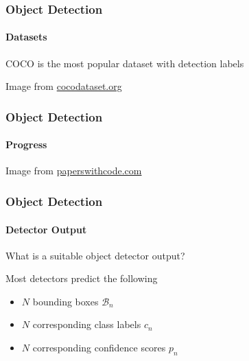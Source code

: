 \documentclass[xetex,professionalfont]{beamer}
\newcommand{\cB}{\mathcal{B}}
\begin{document}
\begin{frame}
	\frametitle{Object Detection}
	\framesubtitle{Datasets}

	COCO is the most popular dataset with detection labels

	\bigskip

	\begin{center}
		{\centering Image from \href{http://cocodataset.org}{cocodataset.org}}
	\end{center}

\end{frame}


\begin{frame}
	\frametitle{Object Detection}
	\framesubtitle{Progress}

	\begin{center}
		{\centering Image from \href{https://paperswithcode.com/sota/object-detection-on-coco}{paperswithcode.com}}
	\end{center}

\end{frame}


\begin{frame}
	\frametitle{Object Detection}
	\framesubtitle{Detector Output}

	What is a suitable object detector output?

	\bigskip

	Most detectors predict the following
	\begin{itemize}
		\item $N$ bounding boxes $\cB_n$
		\item $N$ corresponding class labels $c_n$
		\item $N$ corresponding confidence scores $p_n$
	\end{itemize}

\end{frame}
\end{document}
